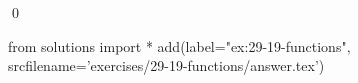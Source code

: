 
\begin{ex}
  \label{ex:29-19-functions}
  
  \qed
\end{ex}
\begin{python0}
from solutions import *
add(label="ex:29-19-functions",
    srcfilename='exercises/29-19-functions/answer.tex')
\end{python0}
